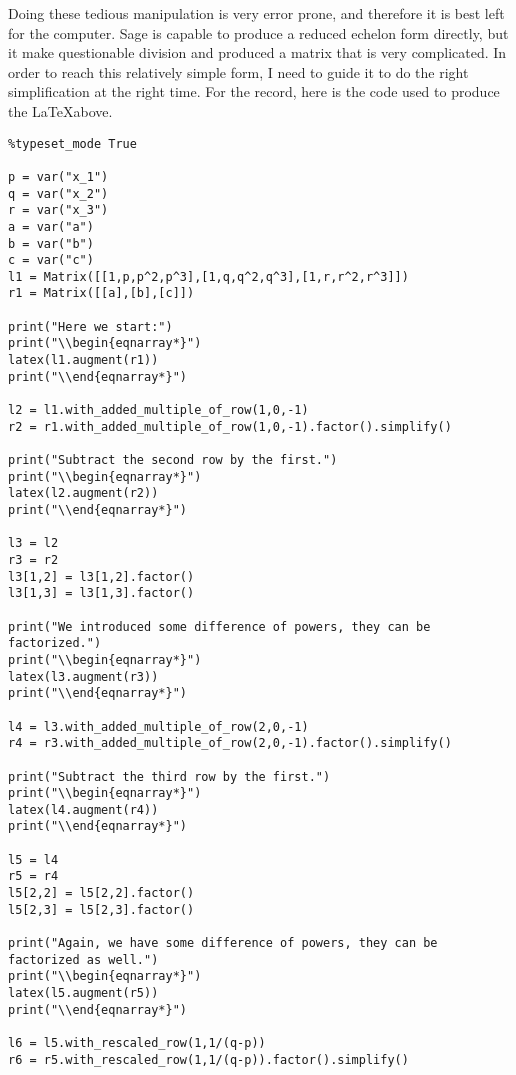 Doing these tedious manipulation is very error prone, and therefore it is best left for the computer. Sage is capable to produce a reduced echelon form directly, but it make questionable division and produced a matrix that is very complicated. In order to reach this relatively simple form, I need to guide it to do the right simplification at the right time. For the record, here is the code used to produce the \LaTeX above. 
\begin{verbatim}
%typeset_mode True

p = var("x_1")
q = var("x_2")
r = var("x_3")
a = var("a")
b = var("b")
c = var("c")
l1 = Matrix([[1,p,p^2,p^3],[1,q,q^2,q^3],[1,r,r^2,r^3]])
r1 = Matrix([[a],[b],[c]])

print("Here we start:")
print("\\begin{eqnarray*}")
latex(l1.augment(r1))
print("\\end{eqnarray*}")

l2 = l1.with_added_multiple_of_row(1,0,-1)
r2 = r1.with_added_multiple_of_row(1,0,-1).factor().simplify()

print("Subtract the second row by the first.")
print("\\begin{eqnarray*}")
latex(l2.augment(r2))
print("\\end{eqnarray*}")

l3 = l2
r3 = r2
l3[1,2] = l3[1,2].factor()
l3[1,3] = l3[1,3].factor()

print("We introduced some difference of powers, they can be factorized.")
print("\\begin{eqnarray*}")
latex(l3.augment(r3))
print("\\end{eqnarray*}")

l4 = l3.with_added_multiple_of_row(2,0,-1)
r4 = r3.with_added_multiple_of_row(2,0,-1).factor().simplify()

print("Subtract the third row by the first.")
print("\\begin{eqnarray*}")
latex(l4.augment(r4))
print("\\end{eqnarray*}")

l5 = l4
r5 = r4
l5[2,2] = l5[2,2].factor()
l5[2,3] = l5[2,3].factor()

print("Again, we have some difference of powers, they can be factorized as well.")
print("\\begin{eqnarray*}")
latex(l5.augment(r5))
print("\\end{eqnarray*}")

l6 = l5.with_rescaled_row(1,1/(q-p))
r6 = r5.with_rescaled_row(1,1/(q-p)).factor().simplify()


\end{verbatim}
